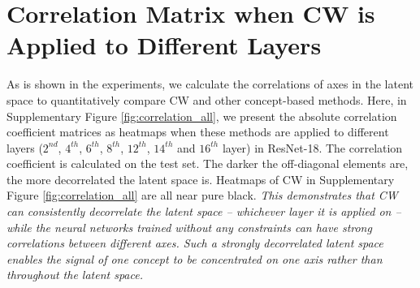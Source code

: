 \documentclass{article}
\begin{document}
\section{Correlation Matrix when CW is Applied to Different Layers}
\label{sec:correlation_all}
As is shown in the experiments, we calculate the correlations of axes in the latent space to quantitatively compare CW and other concept-based methods. Here, in Supplementary Figure  \ref{fig:correlation_all}, we present the absolute correlation coefficient matrices as heatmaps when these methods are applied to different layers ($2^{nd}$, $4^{th}$, $6^{th}$, $8^{th}$, $12^{th}$, $14^{th}$ and $16^{th}$ layer) in ResNet-18. The correlation coefficient is calculated on the test set. The darker the off-diagonal elements are, the more decorrelated the latent space is. Heatmaps of CW in Supplementary Figure  \ref{fig:correlation_all} are all near pure black. \textit{This demonstrates that CW can consistently decorrelate the latent space -- whichever layer it is applied on -- while the neural networks trained without any constraints can have strong correlations between different axes. Such a strongly decorrelated latent space enables the signal of one concept to be concentrated on one axis rather than throughout the latent space.} 
\end{document}
